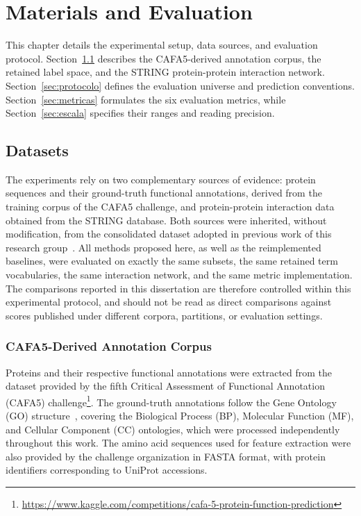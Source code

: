 \documentclass[Ingles]{ic-tese-v3}
\begin{document}
\chapter{Materials and Evaluation}
\label{cap:materiais}

This chapter details the experimental setup, data sources, and evaluation protocol.
Section~\ref{sec:datasets} describes the CAFA5-derived annotation corpus, the
retained label space, and the STRING protein-protein interaction network.
Section~\ref{sec:protocolo} defines the evaluation universe and prediction
conventions. Section~\ref{sec:metricas} formulates the six evaluation metrics,
while Section~\ref{sec:escala} specifies their ranges and reading precision.

\section{Datasets}
\label{sec:datasets}

The experiments rely on two complementary sources of evidence: protein sequences
and their ground-truth functional annotations, derived from the training corpus
of the CAFA5 challenge, and protein-protein interaction data obtained from the
STRING database. Both sources were inherited, without modification, from the
consolidated dataset adopted in previous work of this research
group~\cite{oliveira2025supermagov2}. All methods proposed here, as well as the
reimplemented baselines, were evaluated on exactly the same subsets, the same
retained term vocabularies, the same interaction network, and the same metric
implementation. The comparisons reported in this dissertation are therefore
controlled within this experimental protocol, and should not be read as direct
comparisons against scores published under different corpora, partitions, or
evaluation settings.

\subsection{CAFA5-Derived Annotation Corpus}
\label{subsec:cafa5}

Proteins and their respective functional annotations were extracted from the
dataset provided by the fifth Critical Assessment of Functional Annotation
(CAFA5)
challenge\footnote{\url{https://www.kaggle.com/competitions/cafa-5-protein-function-prediction}}.
The ground-truth annotations follow the Gene Ontology (GO)
structure~\cite{ashburner_gene_2000, The_Gene_Ontology_Consortium_2018}, covering
the Biological Process (BP), Molecular Function (MF), and Cellular Component (CC)
ontologies, which were processed independently throughout this work. The amino
acid sequences used for feature extraction were also provided by the challenge
organization in FASTA format, with protein identifiers corresponding to UniProt
accessions.
\end{document}
